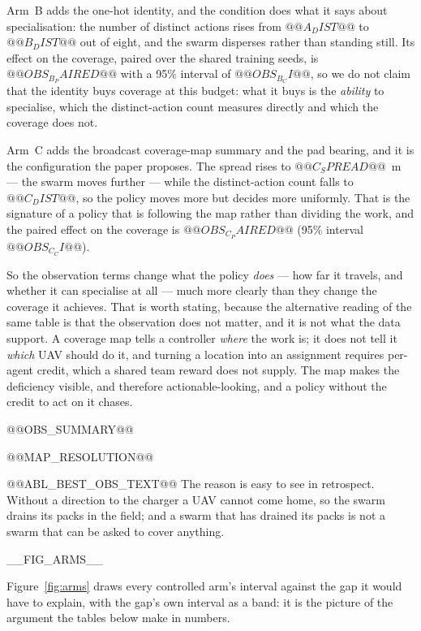 Arm~B adds the one-hot identity, and the condition does what it says about
specialisation: the number of distinct actions rises from $@@A_DIST@@$ to
$@@B_DIST@@$ out of eight, and the swarm disperses rather than standing
still.  Its effect on the coverage, paired over the shared training seeds,
is $@@OBS_B_PAIRED@@$ with a 95\% interval of $@@OBS_B_CI@@$, so we do
not claim that the identity buys coverage at this budget: what it buys is
the \emph{ability} to specialise, which the distinct-action count measures
directly and which the coverage does not.

Arm~C adds the broadcast coverage-map summary and the pad bearing, and it
is the configuration the paper proposes.  The spread rises to
$@@C_SPREAD@@$~m --- the swarm moves further --- while the distinct-action
count falls to $@@C_DIST@@$, so the policy moves more but decides more
uniformly.  That is the signature of a policy that is following the map
rather than dividing the work, and the paired effect on the coverage is
$@@OBS_C_PAIRED@@$ (95\% interval $@@OBS_C_CI@@$).

So the observation terms change what the policy \emph{does} --- how far it
travels, and whether it can specialise at all --- much more clearly than
they change the coverage it achieves.  That is worth stating, because the
alternative reading of the same table is that the observation does not
matter, and it is not what the data support.  A coverage map tells a
controller \emph{where} the work is; it does not tell it \emph{which} UAV
should do it, and turning a location into an assignment requires per-agent
credit, which a shared team reward does not supply.  The map makes the
deficiency visible, and therefore actionable-looking, and a policy without
the credit to act on it chases.

@@OBS_SUMMARY@@

@@MAP_RESOLUTION@@

@@ABL_BEST_OBS_TEXT@@  The reason is easy to see in
retrospect.  Without a direction to the charger a UAV cannot come home, so
the swarm drains its packs in the field; and a swarm that has drained its
packs is not a swarm that can be asked to cover anything.


__FIG_ARMS__

Figure~\ref{fig:arms} draws every controlled arm's interval against the gap it would have to explain, with the gap's own interval as a band: it is the picture of the argument the tables below make in numbers.

